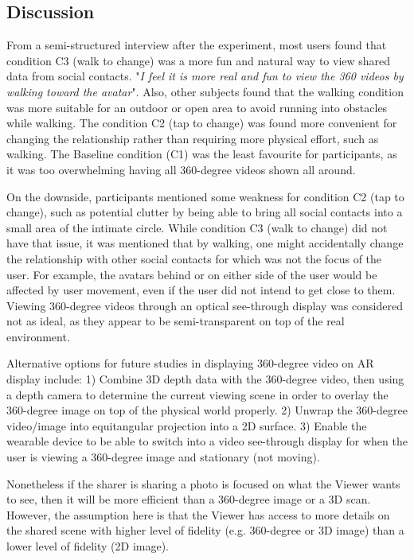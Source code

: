 \subsection{Discussion}

From a semi-structured interview after the experiment, most users found that condition C3 (walk to change) was a more fun and natural way to view shared data from social contacts. "\textit{I feel it is more real and fun to view the 360 videos by walking toward the avatar}". Also, other subjects found that the walking condition was more suitable for an outdoor or open area to avoid running into obstacles while walking. The condition C2 (tap to change) was found more convenient for changing the relationship rather than requiring more physical effort, such as walking. The Baseline condition (C1) was the least favourite for participants, as it was too overwhelming having all 360-degree videos shown all around. 

On the downside, participants mentioned some weakness for condition C2 (tap to change), such as potential clutter by being able to bring all social contacts into a small area of the intimate circle. While condition C3 (walk to change) did not have that issue, it was mentioned that by walking, one might accidentally change the relationship with other social contacts for which was not the focus of the user. For example, the avatars behind or on either side of the user would be affected by user movement, even if the user did not intend to get close to them. Viewing 360-degree videos through an optical see-through display was considered not as ideal, as they appear to be semi-transparent on top of the real environment. 

Alternative options for future studies in displaying 360-degree video on AR display include: 1) Combine 3D depth data with the 360-degree video, then using a depth camera to determine the current viewing scene in order to overlay the 360-degree image on top of the physical world properly. 2) Unwrap the 360-degree video/image into equitangular projection into a 2D surface. 3) Enable the wearable device to be able to switch into a video see-through display for when the user is viewing a 360-degree image and stationary (not moving).

Nonetheless if the sharer is sharing a photo is focused on what the Viewer wants to see, then it will be more efficient than a 360-degree image or a 3D scan. However, the assumption here is that the Viewer has access to more details on the shared scene with higher level of fidelity (e.g. 360-degree or 3D image) than a lower level of fidelity (2D image). 

